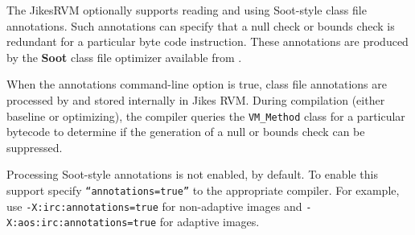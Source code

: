 The Jikes\trademark RVM optionally supports reading and using
Soot-style class file 
annotations.  Such annotations can specify that a null check or bounds
check is redundant for a particular byte code instruction.  These
annotations are produced by the {\bf Soot} class file optimizer
available from
\xlink{\SOOTURL}{\SOOTURL}.  


When the annotations command-line option is true, class file
annotations are processed by  and stored internally in Jikes RVM.
During compilation (either baseline or optimizing), the compiler 
queries the {\tt VM\_Method} class for a particular bytecode to
determine if the generation of a null or bounds check can be
suppressed. 

Processing Soot-style annotations is not enabled, by default.  To
enable this support specify {\tt ``annotations=true''} to the
appropriate compiler.  For example, use {\tt -X:irc:annotations=true}
for non-adaptive images and {\tt -X:aos:irc:annotations=true} for
adaptive images.

\JikesTMFooter